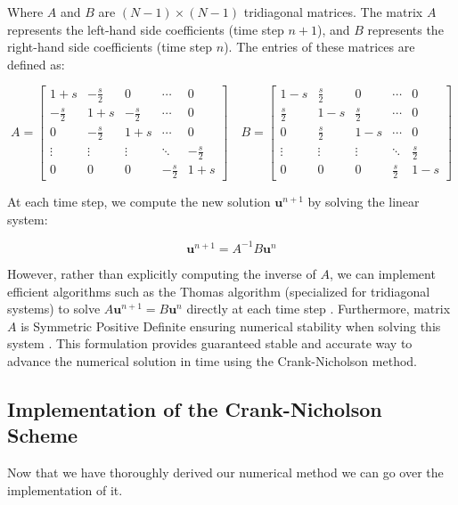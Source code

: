 \documentclass[12pt, reqno]{amsart}
\begin{document}
Where $A$ and $B$ are $(N-1) \times (N-1)$ tridiagonal matrices. The matrix $A$ represents the left-hand side coefficients (time step $n+1$), and $B$ represents the right-hand side coefficients (time step $n$). The entries of these matrices are defined as:

\[
A = \begin{bmatrix}
1 + s & -\frac{s}{2} & 0 & \cdots & 0 \\
-\frac{s}{2} & 1 + s & -\frac{s}{2} & \cdots & 0 \\
0 & -\frac{s}{2} & 1 + s & \cdots & 0 \\
\vdots & \vdots & \vdots & \ddots & -\frac{s}{2} \\
0 & 0 & 0 & -\frac{s}{2} & 1 + s
\end{bmatrix}
\quad
B = \begin{bmatrix}
1 - s & \frac{s}{2} & 0 & \cdots & 0 \\
\frac{s}{2} & 1 - s & \frac{s}{2} & \cdots & 0 \\
0 & \frac{s}{2} & 1 - s & \cdots & 0 \\
\vdots & \vdots & \vdots & \ddots & \frac{s}{2} \\
0 & 0 & 0 & \frac{s}{2} & 1 - s
\end{bmatrix}
\]

At each time step, we compute the new solution $\mathbf{u}^{n+1}$ by solving the linear system:

\[
\mathbf{u}^{n+1} = A^{-1} B \mathbf{u}^n
\]

However, rather than explicitly computing the inverse of $A$, we can implement efficient algorithms such as the Thomas algorithm (specialized for tridiagonal systems) to solve $A \mathbf{u}^{n+1} = B \mathbf{u}^n$ directly at each time step \cite{2}. Furthermore, matrix $A$ is Symmetric Positive Definite ensuring numerical stability when solving this system \cite{3}. This formulation provides guaranteed stable and accurate way to advance the numerical solution in time using the Crank-Nicholson method.



\subsection{Implementation of the Crank-Nicholson Scheme}
Now that we have thoroughly derived our numerical method we can go over the implementation of it.
\end{document}
